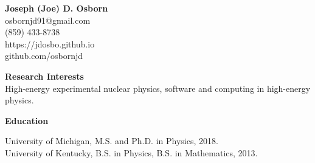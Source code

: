 \documentclass[11pt]{article}
\begin{document}

\begin{center}
\Large\textbf{Joseph (Joe) D. Osborn} \\
\normalsize
osbornjd91@gmail.com \\
(859) 433-8738 \\
https://jdosbo.github.io \\
github.com/osbornjd
\end{center}



\begin{flushleft}
\Large\textbf{Research Interests} \\
\normalsize High-energy experimental nuclear physics, software and computing in high-energy physics.  \\ 
\end{flushleft}











\vspace{3pt}
\begin{flushleft}
\Large\textbf{Education} \\
\normalsize 

University of Michigan, M.S. and Ph.D. in Physics, 2018. \\
University of Kentucky, B.S. in Physics, B.S. in Mathematics, 2013.\\


\end{flushleft}
\end{document}
